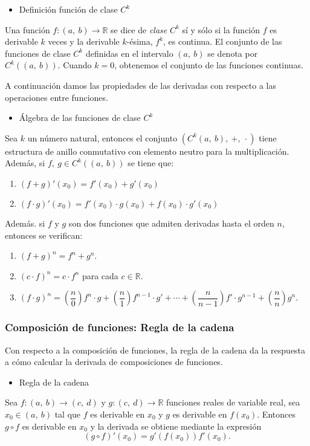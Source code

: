 \begin{itemize}[label=\color{red}\textbullet, leftmargin=*]
	\item \color{lightblue}Definición función de clase $C^k$
\end{itemize}
Una función $f:(a,~b)\rightarrow\mathbb{R}$ se dice de \textit{clase }$C^k$ sí y sólo si la función $f$ es derivable $k$ veces y la derivable $k$-ésima, $f^k$, es continua. El conjunto de las funciones de clase $C^k$ definidas en el intervalo $(a,~b)$ se denota por $C^k\left((a,~b)\right)$. Cuando $k=0$, obtenemos el conjunto de las funciones continuas.

A continuación damos las propiedades de las derivadas con respecto a las operaciones entre funciones.

\begin{itemize}[label=\color{red}\textbullet, leftmargin=*]
	\item \color{lightblue}Álgebra de las funciones de clase $C^k$
\end{itemize}
Sea $k$ un número natural, entonces el conjunto $\left(C^k(a,~b),~+,~\cdot\right)$ tiene estructura de anillo conmutativo con elemento neutro para la multiplicación. Además, si $f,~g\in C^k\left((a,~b)\right)$ se tiene que:
\begin{enumerate}[label=\arabic*)]
	\item $(f+g)'(x_0)=f'(x_0)+g'(x_0)$
	\item $(f\cdot g)'(x_0)=f'(x_0)\cdot g(x_0)+f(x_0)\cdot g'(x_0)$
\end{enumerate}
Además. si $f$ y $g$ son dos funciones que admiten derivadas hasta el orden $n$, entonces se verifican:
\begin{enumerate}[label=\arabic*)]
	\item $(f+g)^n=f^n+g^n$.
	\item $(c\cdot f)^n=c\cdot f^n$ para cada $c\in\mathbb{R}$.
	\item $(f\cdot g)^n=\left(\dfrac{n}{0}\right)f^n\cdot g+\left(\dfrac{n}{1}\right)f^{n-1}\cdot g'+\cdots+\left(\dfrac{n}{n-1}\right)f'\cdot g^{n-1}+\left(\dfrac{n}{n}\right)g^n$. 
\end{enumerate}
\subsubsection{Composición de funciones: Regla de la cadena}
Con respecto a la composición de funciones, la regla de la cadena da la respuesta a cómo calcular la derivada de composiciones de funciones.
\begin{itemize}[label=\color{red}\textbullet, leftmargin=*]
	\item \color{lightblue}Regla de la cadena
\end{itemize}
Sea $f:(a,~b)\rightarrow(c,~d)$ y $g:(c,~d)\rightarrow\mathbb{R}$ funciones reales de variable real, sea $x_0\in(a,~b)$ tal que $f$ es derivable en $x_0$ y $g$ es derivable en $f(x_0)$. Entonces $g\circ f$ es derivable en $x_0$ y la derivada se obtiene mediante la expresión \[ (g\circ f)'(x_0)=g'\left(f(x_0)\right)f'(x_0). \]
